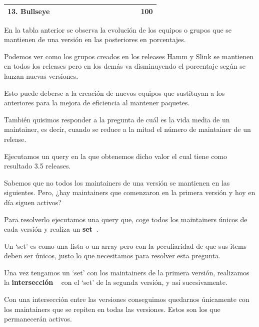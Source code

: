 \documentclass[a4paper, 12pt]{book}
\begin{document}
\begin{table}[htbp]
{\begin{tabular}{|l|l|l|l|l|l|l|l|l|l|l|l|l|l|}
		13. Bullseye & \cellcolor[HTML]{000000} & \cellcolor[HTML]{000000} & \cellcolor[HTML]{000000} & \cellcolor[HTML]{000000} & \cellcolor[HTML]{000000} & \cellcolor[HTML]{000000} & \cellcolor[HTML]{000000} & \cellcolor[HTML]{000000} & \cellcolor[HTML]{000000} & \cellcolor[HTML]{000000} & \cellcolor[HTML]{000000} & \cellcolor[HTML]{000000} & 100          \\ \hline
	\end{tabular}}
\end{table}

En la tabla anterior se observa la evolución de los equipos o grupos que se mantienen de una versión en las posteriores en porcentajes.

Podemos ver como los grupos creados en los releases Hamm y Slink se mantienen en todos los releases pero en los demás va disminuyendo el porcentaje según se lanzan nuevas versiones.

Esto puede deberse a la creación de nuevos equipos que sustituyan a los anteriores para la mejora de eficiencia al mantener paquetes.

También quisimos responder a la pregunta de cuál es la vida media de un maintainer, es decir, cuando se reduce a la mitad el número de maintainer de un release. 

Ejecutamos un query en la que obtenemos dicho valor el cual tiene como resultado 3.5 releases.

Sabemos que no todos los maintainers de una versión se mantienen en las siguientes. Pero, ¿hay maintainers que comenzaron en la primera versión y hoy en día siguen activos?

Para resolverlo ejecutamos una query que, coge todos los maintainers únicos de cada versión y realiza un \textbf{set~\cite{ellibrodepython:_set}}.

Un `set' es como una lista o un array pero con la peculiaridad de que sus items deben ser únicos, justo lo que necesitamos para resolver esta pregunta.

Una vez tengamos un `set' con los maintainers de la primera versión, realizamos la \textbf{intersección} ~\cite{medium:_intersection} con el `set' de la segunda versión, y así sucesivamente. 

Con una intersección entre las versiones conseguimos quedarnos únicamente con los maintainers que se repiten en todas las versiones. Estos son los que permanecerán activos.
\end{document}
